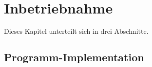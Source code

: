 \documentclass[../Bachelorarbeit.tex]{subfiles}
\begin{document}
\section{Inbetriebnahme}
Dieses Kapitel unterteilt sich in drei Abschnitte.

\subsection{Programm-Implementation}
\blindtext[1]
\end{document}
